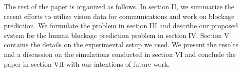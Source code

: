 \documentclass[conference]{IEEEtran}
\begin{document}
The rest of the paper is organized as follows. In section II, we summarize the recent efforts to utilize vision data for communications and work on blockage prediction. We formulate the problem in section III and describe our proposed system for the human blockage prediction problem in section IV. Section V contains the details on the experimental setup we used. We present the results and a discussion on the simulations conducted in section VI and conclude the paper in section VII with our intentions of future work.


% 
% 
% 
% 







%
%
\end{document}

